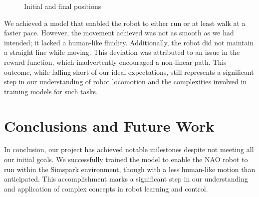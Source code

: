 \documentclass[conference]{IEEEtran}
\begin{document}
\begin{figure}[hbtp]
    \centering
    \caption{Initial and final positions}
    \label{fig:ini-final}
\end{figure}

We achieved a model that enabled the robot to either run or at least walk at a faster pace. However, the movement achieved was not as smooth as we had intended; it lacked a human-like fluidity. Additionally, the robot did not maintain a straight line while moving. This deviation was attributed to an issue in the reward function, which inadvertently encouraged a non-linear path. This outcome, while falling short of our ideal expectations, still represents a significant step in our understanding of robot locomotion and the complexities involved in training models for such tasks.

\section{Conclusions and Future Work}\label{Conclusions and Future Work}

In conclusion, our project has achieved notable milestones despite not meeting all our initial goals. We successfully trained the model to enable the NAO robot to run within the Simspark environment, though with a less human-like motion than anticipated. This accomplishment marks a significant step in our understanding and application of complex concepts in robot learning and control.
\end{document}
